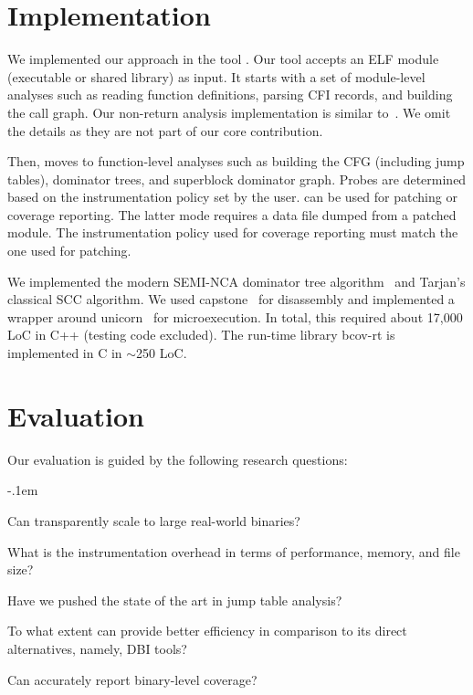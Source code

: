 \section{Implementation}

We implemented our approach in the tool {\bcov}.
Our tool accepts an ELF module (executable or shared library) as input.
It starts with a set of module-level analyses such as reading function definitions, parsing CFI records, and building the call graph.
Our non-return analysis implementation is similar to~\cite{Meng:ISSTA2016}.
We omit the details as they are not part of our core contribution.

Then, {\bcov} moves to function-level analyses such as building the CFG (including jump tables), dominator trees, and superblock dominator graph.
Probes are determined based on the instrumentation policy set by the user.
{\bcov} can be used for patching or coverage reporting.
The latter mode requires a data file dumped from a patched module.
The instrumentation policy used for coverage reporting must match the one used for patching. 

We implemented the modern SEMI-NCA dominator tree algorithm~\cite{Georgiadis2005} and Tarjan's classical SCC algorithm.
We used \textsf{capstone}~\cite{CapstoneEngine} for disassembly and implemented a wrapper around \textsf{unicorn}~\cite{UnicornEngine} for microexecution.
In total, this required about 17,000 LoC in C++ (testing code excluded).
The run-time library \textsf{bcov-rt} is implemented in C in $\sim$250 LoC.


\section{Evaluation}
\label{sec:evaluation}

Our evaluation is guided by the following research questions:

\begin{description}
    \itemsep-.1em
    \item[RQ1] Can {\bcov} transparently scale to large real-world binaries?
    \item[RQ2] What is the instrumentation overhead in terms of performance, memory, and file size?        
    \item[RQ3] Have we pushed the state of the art in jump table analysis?    
    \item[RQ4] To what extent can {\bcov} provide better efficiency in comparison to its direct alternatives, namely, DBI tools?    
    \item[RQ5] Can {\bcov} accurately report binary-level coverage?    

\end{description}

